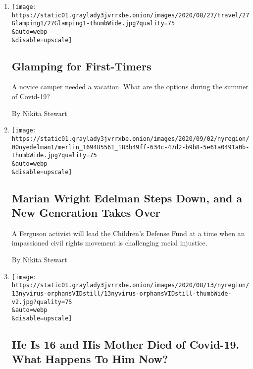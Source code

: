 \begin{enumerate}
\def\labelenumi{\arabic{enumi}.}
\item
  \href{/2020/09/03/travel/virus-glamping.html}{}

  \texttt{[image: https://static01.graylady3jvrrxbe.onion/images/2020/08/27/travel/27Glamping1/27Glamping1-thumbWide.jpg?quality=75\\\&auto=webp\\\&disable=upscale]}

  \hypertarget{glamping-for-first-timers}{%
  \subsection{Glamping for
  First-Timers}\label{glamping-for-first-timers}}

  A novice camper needed a vacation. What are the options during the
  summer of Covid-19?

  By Nikita Stewart
\item
  \href{/2020/09/03/nyregion/marian-wright-edelman-childrens-defense-fund.html}{}

  \texttt{[image: https://static01.graylady3jvrrxbe.onion/images/2020/09/02/nyregion/00nyedelman1/merlin\_169485561\_183b49ff-634c-47d2-b9b8-5e61a0491a0b-thumbWide.jpg?quality=75\\\&auto=webp\\\&disable=upscale]}

  \hypertarget{marian-wright-edelman-steps-down-and-a-new-generation-takes-over}{%
  \subsection{Marian Wright Edelman Steps Down, and a New Generation
  Takes
  Over}\label{marian-wright-edelman-steps-down-and-a-new-generation-takes-over}}

  A Ferguson activist will lead the Children's Defense Fund at a time
  when an impassioned civil rights movement is challenging racial
  injustice.

  By Nikita Stewart
\item
  \href{/2020/08/13/nyregion/coronavius-ny-parents-dead.html}{}

  \texttt{[image: https://static01.graylady3jvrrxbe.onion/images/2020/08/13/nyregion/13nyvirus-orphansVIDstill/13nyvirus-orphansVIDstill-thumbWide-v2.jpg?quality=75\\\&auto=webp\\\&disable=upscale]}

  \hypertarget{he-is-16-and-his-mother-died-of-covid-19-what-happens-to-him-now}{%
  \subsection{He Is 16 and His Mother Died of Covid-19. What Happens To
  Him
  Now?}\label{he-is-16-and-his-mother-died-of-covid-19-what-happens-to-him-now}}


\end{enumerate}
